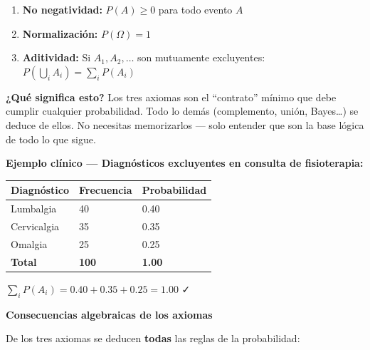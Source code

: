 \documentclass[
  letterpaper,
  DIV=11,
  numbers=noendperiod]{scrartcl}
\newcounter{none} %
\providecommand{\tightlist}{%
  \setlength{\itemsep}{0pt}\setlength{\parskip}{0pt}}
\begin{document}
\begin{enumerate}
\def\labelenumi{\arabic{enumi}.}
\tightlist
\item
  \textbf{No negatividad:} \(P(A) \geq 0\) para todo evento \(A\)
\item
  \textbf{Normalización:} \(P(\Omega) = 1\)
\item
  \textbf{Aditividad:} Si \(A_1, A_2, \ldots\) son mutuamente
  excluyentes: \(P(\bigcup_i A_i) = \sum_i P(A_i)\)
\end{enumerate}

\begin{tcolorbox}[enhanced jigsaw, arc=.35mm, bottomrule=.15mm, bottomtitle=1mm, breakable, colback=white, colbacktitle=quarto-callout-tip-color!10!white, colframe=quarto-callout-tip-color-frame, coltitle=black, left=2mm, leftrule=.75mm, opacityback=0, opacitybacktitle=0.6, rightrule=.15mm, title=\textcolor{quarto-callout-tip-color}{\faLightbulb}\hspace{0.5em}{Tip}, titlerule=0mm, toprule=.15mm, toptitle=1mm]

\textbf{¿Qué significa esto?} Los tres axiomas son el ``contrato''
mínimo que debe cumplir cualquier probabilidad. Todo lo demás
(complemento, unión, Bayes\ldots) se deduce de ellos. No necesitas
memorizarlos --- solo entender que son la base lógica de todo lo que
sigue.

\end{tcolorbox}

\textbf{Ejemplo clínico --- Diagnósticos excluyentes en consulta de
fisioterapia:}

{\def\LTcaptype{none} %
\begin{longtable}[]{@{}lll@{}}
\toprule\noalign{}
Diagnóstico & Frecuencia & Probabilidad \\
\midrule\noalign{}
\endhead
\bottomrule\noalign{}
\endlastfoot
Lumbalgia & 40 & 0.40 \\
Cervicalgia & 35 & 0.35 \\
Omalgia & 25 & 0.25 \\
\textbf{Total} & \textbf{100} & \textbf{1.00} \\
\end{longtable}
}

\(\sum_i P(A_i) = 0.40 + 0.35 + 0.25 = 1.00\) ✓

\begin{tcolorbox}[enhanced jigsaw, arc=.35mm, bottomrule=.15mm, bottomtitle=1mm, breakable, colback=white, colbacktitle=quarto-callout-note-color!10!white, colframe=quarto-callout-note-color-frame, coltitle=black, left=2mm, leftrule=.75mm, opacityback=0, opacitybacktitle=0.6, rightrule=.15mm, title=\textcolor{quarto-callout-note-color}{\faInfo}\hspace{0.5em}{Note}, titlerule=0mm, toprule=.15mm, toptitle=1mm]

\textbf{Consecuencias algebraicas de los axiomas}

De los tres axiomas se deducen \textbf{todas} las reglas de la
probabilidad:

\end{tcolorbox}
\end{document}
